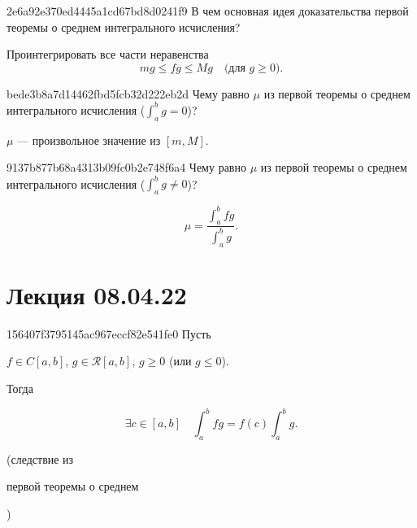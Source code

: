 \begin{note}{2e6a92e370ed4445a1cd67bd8d0241f9}
    В чем основная идея доказательства первой теоремы о среднем интегрального исчисления?

    \begin{cloze}{1}
        Проинтегрировать все части неравенства
        \[
            mg \leqslant fg \leqslant Mg \quad \text{(для \({ g \geqslant 0 }\))}.
        \]
    \end{cloze}
\end{note}

\begin{note}{bede3b8a7d14462fbd5fcb32d222eb2d}
    Чему равно \({ \mu }\) из первой теоремы о среднем интегрального исчисления (\({ \int_{a}^{b} g = 0 }\))?

    \begin{cloze}{1}
        \({ \mu }\) --- произвольное значение из \({ [m, M] }\).
    \end{cloze}
\end{note}

\begin{note}{9137b877b68a4313b09fc0b2e748f6a4}
    Чему равно \({ \mu }\) из первой теоремы о среднем интегрального исчисления (\({ \int_{a}^{b} g \neq 0 }\))?

    \begin{cloze}{1}
        \[
            \mu = \frac{\int_{a}^{b} fg}{\int_{a}^{b} g}.
        \]
    \end{cloze}
\end{note}

\section{Лекция 08.04.22}
\begin{note}{156407f3795145ac967eccf82e541fe0}
    Пусть \begin{icloze}{2}\({ f \in C[a, b] }\), \({ g \in \mathcal R[a, b] }\), \({ g \geqslant 0 }\) (или \({ g \leqslant 0 }\)).\end{icloze}
    Тогда
    \begin{icloze}{1}
        \[
            \exists c \in [a, b] \quad \int_{a}^{b} fg = f(c) \int_{a}^{b} g.
        \]
    \end{icloze}

    \begin{center}
        \tiny
        (следствие из \begin{icloze}{3}первой теоремы о среднем\end{icloze})
    \end{center}
\end{note}

